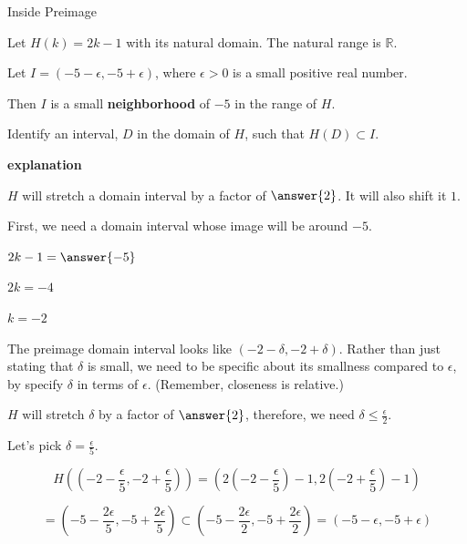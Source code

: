 \documentclass{ximera}
\begin{document}
\begin{example} Inside Preimage

Let $H(k) = 2k - 1$ with its natural domain.  The natural range is $\mathbb{R}$.

Let  $I = (-5-\epsilon, -5+\epsilon)$, where $\epsilon > 0$ is a small positive real number.  

Then $I$ is a small \textbf{neighborhood} of $-5$ in the range of $H$.


Identify an interval, $D$ in the domain of $H$, such that $H(D) \subset I$.

\textbf{\textcolor{red!75!green}{explanation}} 





$H$ will stretch a domain interval by a factor of $\answer{2}$.  It will also shift it $1$.  


First, we need a domain interval whose image will be around $-5$.

$2k - 1 = \answer{-5}$

$2k = -4$

$k = -2$



The preimage domain interval looks like $\left( -2 - \delta, -2 + \delta \right)$.  Rather than just stating that $\delta$ is small, we need to be specific about its smallness compared to $\epsilon$, by specify $\delta$ in terms of $\epsilon$. (Remember, closeness is relative.)

$H$ will stretch $\delta$ by a factor of $\answer{2}$, therefore,  we need $\delta \leq \frac{\epsilon}{2}$.   

Let's pick $\delta = \frac{\epsilon}{5}$. 




\[   H \left( \left( -2 - \frac{\epsilon}{5}, -2 + \frac{\epsilon}{5} \right) \right)  = \left( 2\left(-2 - \frac{\epsilon}{5}\right) - 1, 2\left(-2 + \frac{\epsilon}{5}\right) - 1  \right)\]


\[    = \left( -5 - \frac{2 \epsilon}{5} , -5 + \frac{2 \epsilon}{5} \right) \subset \left( -5 - \frac{2 \epsilon}{2} , -5 + \frac{2 \epsilon}{2} \right)  = (-5-\epsilon, -5+\epsilon) \]





\end{example}
\end{document}
